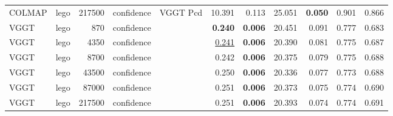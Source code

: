 \begin{table}[H]
\begin{tabular}{llrllrrrrrr}
COLMAP & lego & 217500 & confidence & VGGT Pcd & 10.391 & 0.113 & 25.051 & \textbf{0.050} & 0.901 & 0.866 \\
VGGT & lego & 870 & confidence &  & \textbf{0.240} & \textbf{0.006} & 20.451 & 0.091 & 0.777 & 0.683 \\
VGGT & lego & 4350 & confidence &  & \underline{0.241} & \textbf{0.006} & 20.390 & 0.081 & 0.775 & 0.687 \\
VGGT & lego & 8700 & confidence &  & 0.242 & \textbf{0.006} & 20.375 & 0.079 & 0.775 & 0.688 \\
VGGT & lego & 43500 & confidence &  & 0.250 & \textbf{0.006} & 20.336 & 0.077 & 0.773 & 0.688 \\
VGGT & lego & 87000 & confidence &  & 0.251 & \textbf{0.006} & 20.373 & 0.075 & 0.774 & 0.690 \\
VGGT & lego & 217500 & confidence &  & 0.251 & \textbf{0.006} & 20.393 & 0.074 & 0.774 & 0.691 \\
\bottomrule
\end{tabular}
\end{table}